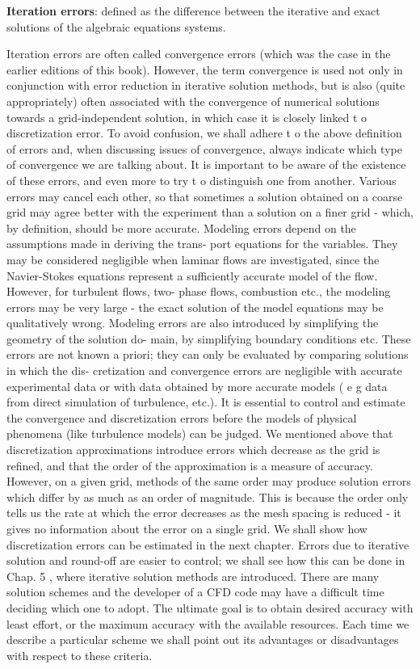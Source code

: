 \begin{itemize}
\textbf{Iteration errors}: defined as the difference between the iterative and exact
solutions of the algebraic equations systems.

Iteration errors are often called convergence errors (which was the case in
the earlier editions of this book). However, the term convergence is used
not only in conjunction with error reduction in iterative solution methods,
but is also (quite appropriately) often associated with the convergence of
numerical solutions towards a grid-independent solution, in which case it is
closely linked t o discretization error. To avoid confusion, we shall adhere t o
the above definition of errors and, when discussing issues of convergence,
always indicate which type of convergence we are talking about.
It is important to be aware of the existence of these errors, and even more
to try t o distinguish one from another. Various errors may cancel each other,
so that sometimes a solution obtained on a coarse grid may agree better with
the experiment than a solution on a finer grid - which, by definition, should
be more accurate.
Modeling errors depend on the assumptions made in deriving the trans-
port equations for the variables. They may be considered negligible when
laminar flows are investigated, since the Navier-Stokes equations represent
a sufficiently accurate model of the flow. However, for turbulent flows, two-
phase flows, combustion etc., the modeling errors may be very large - the
exact solution of the model equations may be qualitatively wrong. Modeling
errors are also introduced by simplifying the geometry of the solution do-
main, by simplifying boundary conditions etc. These errors are not known a
priori; they can only be evaluated by comparing solutions in which the dis-
cretization and convergence errors are negligible with accurate experimental
data or with data obtained by more accurate models ( e g data from direct simulation of turbulence, etc.). 
It is essential to control and estimate the convergence and discretization errors before the models of physical phenomena
(like turbulence models) can be judged.
We mentioned above that discretization approximations introduce errors
which decrease as the grid is refined, and that the order of the approximation
is a measure of accuracy. However, on a given grid, methods of the same order
may produce solution errors which differ by as much as an order of magnitude.
This is because the order only tells us the rate at which the error decreases
as the mesh spacing is reduced - it gives no information about the error on a
single grid. We shall show how discretization errors can be estimated in the
next chapter.
Errors due to iterative solution and round-off are easier to control; we
shall see how this can be done in Chap. 5 , where iterative solution methods
are introduced.
There are many solution schemes and the developer of a CFD code may
have a difficult time deciding which one to adopt. The ultimate goal is to
obtain desired accuracy with least effort, or the maximum accuracy with the
available resources. Each time we describe a particular scheme we shall point
out its advantages or disadvantages with respect to these criteria.

 \end{itemize}


